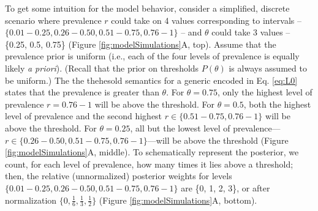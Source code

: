 \documentclass[floatsintext,doc]{apa6}
\newcommand{\denote}[1]{\mbox{ $[\![ #1 ]\!]$}}
\newcommand*\diff{\mathop{}\!\mathrm{d}}
\newcommand{\mht}[1]{{\textcolor{Blue}{[mht: #1]}}}
\begin{document}
To get some intuition for the model behavior, consider a simplified, discrete scenario where prevalence $r$ could take on 4 values corresponding to intervals -- $\{0.01-0.25, 0.26 - 0.50, 0.51 - 0.75, 0.76 - 1\}$ -- and $\theta$ could take 3 values -- \{0.25, 0.5, 0.75\} (Figure \ref{fig:modelSimulations}A, top). Assume that the prevalence prior is uniform (i.e., each of the four levels of prevalence is equally likely \emph{a priori}). (Recall that the prior on thresholds $P(\theta)$ is always assumed to be uniform.)
The the thehesold semantics for a generic encoded in Eq. \ref{eq:L0} states that the prevalence is greater than $\theta$.
For $\theta = 0.75$, only the highest level of prevalence $r = 0.76 - 1$ will be above the threshold.  
For $\theta = 0.5$, both the highest level of prevalence and the second highest $r \in \{0.51 - 0.75, 0.76 - 1\}$ will be above the threshold.  
For $\theta = 0.25$, all but the lowest level of prevalence---$r \in \{0.26 - 0.50, 0.51 - 0.75, 0.76 - 1\}$---will be above the threshold (Figure \ref{fig:modelSimulations}A, middle).  
To schematically represent the posterior, we count, for each level of prevalence, how many times it lies above a threshold; then, the relative (unnormalized) posterior weights for levels $\{0.01-0.25, 0.26 - 0.50, 0.51 - 0.75, 0.76 - 1 \}$ are \{0, 1, 2, 3\}, or after normalization  $\{0, \frac{1}{6}, \frac{1}{3}, \frac{1}{2}\}$ (Figure \ref{fig:modelSimulations}A, bottom).






%
%
\end{document}
